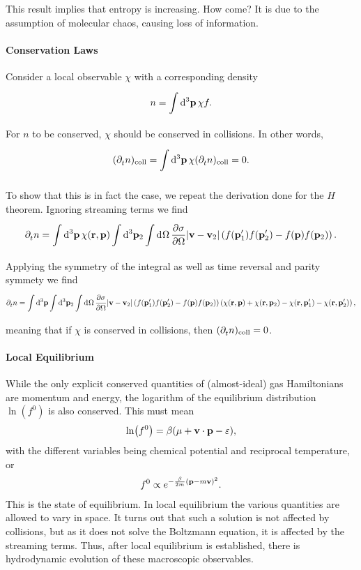 This result implies that entropy is increasing. How come? It is due to the assumption of molecular chaos, causing loss of information.

\paragraph{Conservation Laws}
Consider a local observable $\chi$ with a corresponding density
\begin{align*}
	n = \int\limits_{}^{}\dd[3]{\vb{p}}\chi f.
\end{align*}
For $n$ to be conserved, $\chi$ should be conserved in collisions. In other words,
\begin{align*}
	(\partial^{}_{t}{n})_{\text{coll}} = \int\limits_{}^{}\dd[3]{\vb{p}}\chi (\partial^{}_{t}{n})_{\text{coll}} = 0.
\end{align*}

To show that this is in fact the case, we repeat the derivation done for the $H$ theorem. Ignoring streaming terms we find
\begin{align*}
	\partial^{}_{t}n = \int\limits_{}^{}\dd[3]{\vb{p}}\chi(\vb{r}, \vb{p})\int\limits_{}^{}\dd[3]{\vb{p}_{2}}\int\limits_{}^{}\dd[]{\Omega}\pdv{\sigma}{\Omega}\abs{\vb{v} - \vb{v}_{2}}\left(f(\vb{p}_{1}^{\prime})f(\vb{p}_{2}^{\prime}) - f(\vb{p})f(\vb{p}_{2})\right).
\end{align*}
Applying the symmetry of the integral as well as time reversal and parity symmety we find
\begin{align*}
	\partial^{}_{t}n = \int\limits_{}^{}\dd[3]{\vb{p}}\int\limits_{}^{}\dd[3]{\vb{p}_{2}}\int\limits_{}^{}\dd[]{\Omega}\pdv{\sigma}{\Omega}\abs{\vb{v} - \vb{v}_{2}}\left(f(\vb{p}_{1}^{\prime})f(\vb{p}_{2}^{\prime}) - f(\vb{p})f(\vb{p}_{2})\right)\left(\chi(\vb{r}, \vb{p}) + \chi(\vb{r}, \vb{p}_{2}) - \chi(\vb{r}, \vb{p}_{1}^{\prime}) - \chi(\vb{r}, \vb{p}_{2}^{\prime})\right),
\end{align*}
meaning that if $\chi$ is conserved in collisions, then $(\partial^{}_{t}{n})_{\text{coll}} = 0$.

\paragraph{Local Equilibrium}
While the only explicit conserved quantities of (almost-ideal) gas Hamiltonians are momentum and energy, the logarithm of the equilibrium distribution $\ln(f^{0})$ is also conserved. This must mean
\begin{align*}
	\ln(f^{0}) = \beta(\mu + \vb{v}\cdot\vb{p} - \varepsilon),
\end{align*}
with the different variables being chemical potential and reciprocal temperature, or
\begin{align*}
	f^{0} \propto e^{-\frac{\beta}{2m}(\vb{p} - m\vb{v})^{2}}.
\end{align*}
This is the state of equilibrium. In local equilibrium the various quantities are allowed to vary in space. It turns out that such a solution is not affected by collisions, but as it does not solve the Boltzmann equation, it is affected by the streaming terms. Thus, after local equilibrium is established, there is hydrodynamic evolution of these macroscopic observables.

